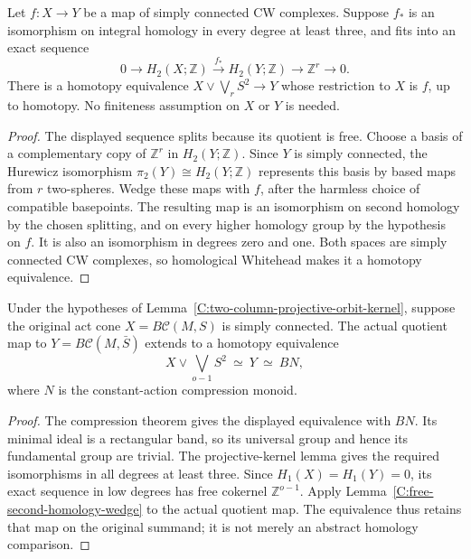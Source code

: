 \begin{lemma}
\label{C:free-second-homology-wedge}
Let $f:X\to Y$ be a map of simply connected CW complexes.
Suppose $f_*$ is an isomorphism on integral homology in every
degree at least three, and fits into an exact sequence
\[
 0\longrightarrow H_2(X;\mathbb Z)
 \xrightarrow{f_*}H_2(Y;\mathbb Z)
 \longrightarrow\mathbb Z^r\longrightarrow0.
\]
There is a homotopy equivalence
$X\vee\bigvee_rS^2\to Y$ whose restriction to $X$ is $f$,
up to homotopy. No finiteness assumption on $X$ or $Y$ is needed.
\end{lemma}
\begin{proof}
The displayed sequence splits because its quotient is free.
Choose a basis of a complementary copy of $\mathbb Z^r$ in
$H_2(Y;\mathbb Z)$. Since $Y$ is simply connected, the Hurewicz
isomorphism $\pi_2(Y)\cong H_2(Y;\mathbb Z)$ represents this
basis by based maps from $r$ two-spheres. Wedge these maps with
$f$, after the harmless choice of compatible basepoints.
The resulting map is an isomorphism on second homology by the
chosen splitting, and on every higher homology group by the
hypothesis on $f$. It is also an isomorphism in degrees zero
and one. Both spaces are simply connected CW complexes, so
homological Whitehead makes it a homotopy equivalence.
\end{proof}

\begin{corollary}
\label{C:two-column-orbit-wedge}
Under the hypotheses of
Lemma~\ref{C:two-column-projective-orbit-kernel}, suppose the
original act cone $X=B\mathcal C(M,S)$ is simply connected.
The actual quotient map to
$Y=B\mathcal C(M,\bar S)$ extends to a homotopy equivalence
\[
 X\vee\bigvee_{o-1}S^2\ \simeq\ Y\ \simeq\ BN,
\]
where $N$ is the constant-action compression monoid.
\end{corollary}
\begin{proof}
The compression theorem gives the displayed equivalence with
$BN$. Its minimal ideal is a rectangular band, so its universal
group and hence its fundamental group are trivial.
The projective-kernel lemma gives the required isomorphisms in
all degrees at least three. Since $H_1(X)=H_1(Y)=0$, its exact
sequence in low degrees has free cokernel $\mathbb Z^{o-1}$.
Apply Lemma~\ref{C:free-second-homology-wedge} to the actual
quotient map. The equivalence thus retains that map on the
original summand; it is not merely an abstract homology comparison.
\end{proof}

